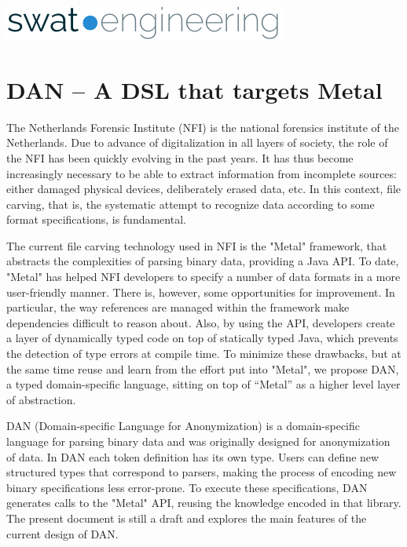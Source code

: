 \documentclass[10pt,oneside]{article}
\begin{document}
\thispagestyle{empty}

\begin{center}
    \includegraphics[width=0.6\linewidth]{logo.pdf}\\
\end{center}

\hypertarget{dan----a-dsl-that-targets-metal}{%
\section*{DAN -- A DSL that targets
Metal}\label{dan----a-dsl-that-targets-metal}}

The Netherlands Forensic Institute (NFI) is the national forensics
institute of the Netherlands. Due to advance of digitalization in all
layers of society, the role of the NFI has been quickly evolving in the
past years. It has thus become increasingly necessary to be able to
extract information from incomplete sources: either damaged physical
devices, deliberately erased data, etc. In this context, file carving,
that is, the systematic attempt to recognize data according to some
format specifications, is fundamental.

The current file carving technology used in NFI is the "Metal"
framework, that abstracts the complexities of parsing binary data,
providing a Java API. To date, "Metal" has helped NFI developers to
specify a number of data formats in a more user-friendly manner. There
is, however, some opportunities for improvement. In particular, the way
references are managed within the framework make dependencies difficult
to reason about. Also, by using the API, developers create a layer of
dynamically typed code on top of statically typed Java, which prevents
the detection of type errors at compile time. To minimize these
drawbacks, but at the same time reuse and learn from the effort put into
"Metal", we propose DAN, a typed domain-specific language, sitting on
top of ``Metal'' as a higher level layer of abstraction.

DAN (Domain-specific Language for Anonymization) is a domain-specific
language for parsing binary data and was originally designed for
anonymization of data. In DAN each token definition has its own type.
Users can define new structured types that correspond to parsers, making
the process of encoding new binary specifications less error-prone. To
execute these specifications, DAN generates calls to the "Metal" API,
reusing the knowledge encoded in that library. The present document is
still a draft and explores the main features of the current design of
DAN.
\end{document}
